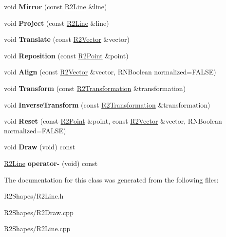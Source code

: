\begin{DoxyCompactItemize}
\item 
void {\bfseries Mirror} (const \hyperlink{class_r2_line}{R2\+Line} \&line)\hypertarget{class_r2_line_a3867cd85fdd98f5847d7483dbb3532ec}{}\label{class_r2_line_a3867cd85fdd98f5847d7483dbb3532ec}

\item 
void {\bfseries Project} (const \hyperlink{class_r2_line}{R2\+Line} \&line)\hypertarget{class_r2_line_a2cce786fd506d9e7ae07b1d2341f6de9}{}\label{class_r2_line_a2cce786fd506d9e7ae07b1d2341f6de9}

\item 
void {\bfseries Translate} (const \hyperlink{class_r2_vector}{R2\+Vector} \&vector)\hypertarget{class_r2_line_a02bdba4cc8461e3a9e56178cb84c28a0}{}\label{class_r2_line_a02bdba4cc8461e3a9e56178cb84c28a0}

\item 
void {\bfseries Reposition} (const \hyperlink{class_r2_point}{R2\+Point} \&point)\hypertarget{class_r2_line_a934b9bdf11d5596dfa7455cf6e3a61cd}{}\label{class_r2_line_a934b9bdf11d5596dfa7455cf6e3a61cd}

\item 
void {\bfseries Align} (const \hyperlink{class_r2_vector}{R2\+Vector} \&vector, R\+N\+Boolean normalized=F\+A\+L\+SE)\hypertarget{class_r2_line_adc5ed069dc3a2c6f8ca8e2ac907dc82c}{}\label{class_r2_line_adc5ed069dc3a2c6f8ca8e2ac907dc82c}

\item 
void {\bfseries Transform} (const \hyperlink{class_r2_transformation}{R2\+Transformation} \&transformation)\hypertarget{class_r2_line_ac4902adc24f53d25ef06132d493fe790}{}\label{class_r2_line_ac4902adc24f53d25ef06132d493fe790}

\item 
void {\bfseries Inverse\+Transform} (const \hyperlink{class_r2_transformation}{R2\+Transformation} \&transformation)\hypertarget{class_r2_line_a97242f3f0786f39eec24fb19108f5be3}{}\label{class_r2_line_a97242f3f0786f39eec24fb19108f5be3}

\item 
void {\bfseries Reset} (const \hyperlink{class_r2_point}{R2\+Point} \&point, const \hyperlink{class_r2_vector}{R2\+Vector} \&vector, R\+N\+Boolean normalized=F\+A\+L\+SE)\hypertarget{class_r2_line_acf77bdeeea7adc7134ed9df5c6d8fd79}{}\label{class_r2_line_acf77bdeeea7adc7134ed9df5c6d8fd79}

\item 
void {\bfseries Draw} (void) const \hypertarget{class_r2_line_a016535588f688aa46e2d981524684774}{}\label{class_r2_line_a016535588f688aa46e2d981524684774}

\item 
\hyperlink{class_r2_line}{R2\+Line} {\bfseries operator-\/} (void) const \hypertarget{class_r2_line_a7da61f8d68e4ddf36784b77ae4c6474b}{}\label{class_r2_line_a7da61f8d68e4ddf36784b77ae4c6474b}

\end{DoxyCompactItemize}


The documentation for this class was generated from the following files\+:\begin{DoxyCompactItemize}
\item 
R2\+Shapes/R2\+Line.\+h\item 
R2\+Shapes/R2\+Draw.\+cpp\item 
R2\+Shapes/R2\+Line.\+cpp\end{DoxyCompactItemize}
